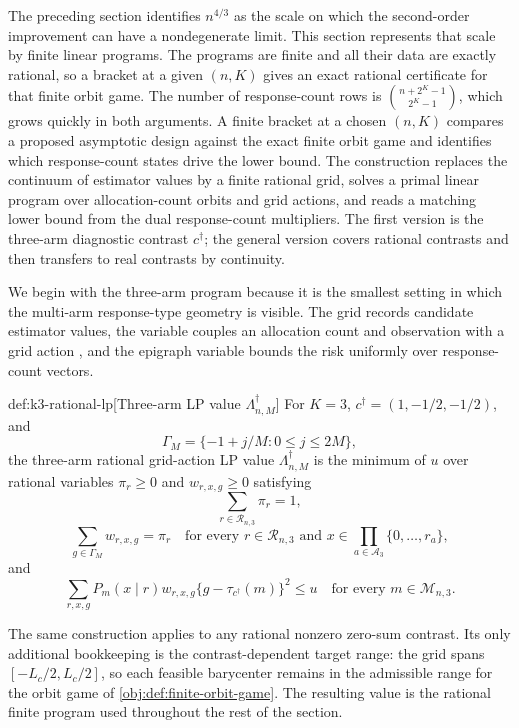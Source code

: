 \documentclass[11pt]{article}
\begin{document}
The preceding section identifies \(n^{4/3}\) as the scale on which the second-order improvement can have a nondegenerate limit. This section represents that scale by finite linear programs. The programs are finite and all their data are exactly rational, so a bracket at a given \((n,K)\) gives an exact rational certificate for that finite orbit game. The number of response-count rows is \(\binom{n+2^K-1}{2^K-1}\), which grows quickly in both arguments. A finite bracket at a chosen \((n,K)\) compares a proposed asymptotic design against the exact finite orbit game and identifies which response-count states drive the lower bound. The construction replaces the continuum of estimator values by a finite rational grid, solves a primal linear program over allocation-count orbits and grid actions, and reads a matching lower bound from the dual response-count multipliers. The first version is the three-arm diagnostic contrast \(c^\dagger\); the general version covers rational contrasts and then transfers to real contrasts by continuity.

We begin with the three-arm program because it is the smallest setting in which the multi-arm response-type geometry is visible. The grid  records candidate estimator values, the variable  couples an allocation count and observation with a grid action , and the epigraph variable  bounds the risk uniformly over response-count vectors.

\begin{definitionv}{def:k3-rational-lp}[Three-arm LP value $\Lambda_{n,M}^\dagger$]
For \(K=3\), \(c^\dagger=(1,-1/2,-1/2)\), and
\[
\Gamma_M=\{-1+j/M:0\le j\le 2M\},
\]
the three-arm rational grid-action LP value \(\Lambda_{n,M}^\dagger\) is the minimum of \(u\) over rational variables \(\pi_r\ge 0\) and \(w_{r,x,g}\ge 0\) satisfying
\[
\sum_{r\in\mathcal R_{n,3}}\pi_r=1,
\]
\[
\sum_{g\in\Gamma_M}w_{r,x,g}=\pi_r
\quad
\text{for every } r\in\mathcal R_{n,3}
\text{ and } x\in\prod_{a\in\mathcal A_3}\{0,\ldots,r_a\},
\]
and
\[
\sum_{r,x,g}P_m(x\mid r)w_{r,x,g}\{g-\tau_{c^\dagger}(m)\}^2\le u
\quad
\text{for every } m\in\mathcal M_{n,3}.
\]
\end{definitionv}

The same construction applies to any rational nonzero zero-sum contrast. Its only additional bookkeeping is the contrast-dependent target range: the grid  spans \([-L_c/2,L_c/2]\), so each feasible barycenter remains in the admissible range for the orbit game of \cref{obj:def:finite-orbit-game}. The resulting value  is the rational finite program used throughout the rest of the section.
\end{document}
